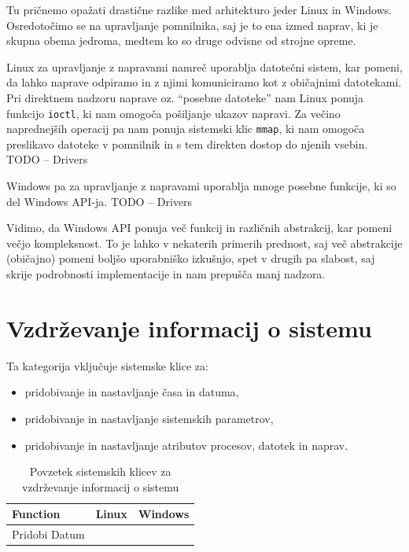 \documentclass[a4paper,12pt,openright]{book}
\begin{document}
Tu pričnemo opažati drastične razlike med arhitekturo jeder Linux in Windows. Osredotočimo se na upravljanje pomnilnika, saj je to ena izmed naprav, ki je skupna obema jedroma, medtem ko so druge odvisne od strojne opreme.

Linux za upravljanje z napravami namreč uporablja datotečni sistem, kar pomeni, da lahko naprave odpiramo in z njimi komuniciramo kot z običajnimi datotekami.
Pri direktnem nadzoru naprave oz. ``posebne datoteke'' nam Linux ponuja funkcijo \verb|ioctl|, ki nam omogoča pošiljanje ukazov napravi.
Za večino naprednejših operacij pa nam ponuja sistemski klic \verb|mmap|, ki nam omogoča preslikavo datoteke v pomnilnik in s tem direkten dostop do njenih vsebin.
TODO -- Drivers \cite{Corbet_Kroah-Hartman_Rubini_2005}

Windows pa za upravljanje z napravami uporablja mnoge posebne funkcije, ki so del Windows API-ja.
TODO -- Drivers

Vidimo, da Windows API ponuja več funkcij in različnih abstrakcij, kar pomeni večjo kompleksnost.
To je lahko v nekaterih primerih prednost, saj več abstrakcije (običajno) pomeni boljšo uporabniško izkušnjo, spet v drugih pa slabost, saj skrije podrobnosti implementacije in nam prepušča manj nadzora.

\section{Vzdrževanje informacij o sistemu}

Ta kategorija vključuje sistemske klice za:
\begin{itemize}
	\item pridobivanje in nastavljanje časa in datuma,
	\item pridobivanje in nastavljanje sistemskih parametrov,
	\item pridobivanje in nastavljanje atributov procesov, datotek in naprav. \cite{Silberschatz_Galvin_Gagne_2018}
\end{itemize}

\begin{table}[h!]
	\begin{center}
		\begin{tabular}{ p{3.7cm}|p{2.5cm}|p{6cm} }
			Function      & Linux   & Windows \\
			\hline
			Pridobi Datum & \verb|| & \verb|| \\
		\end{tabular}
	\end{center}
	\label{tab:information_maintenance}
	\caption{Povzetek sistemskih klicev za vzdrževanje informacij o sistemu}
\end{table}
\end{document}
